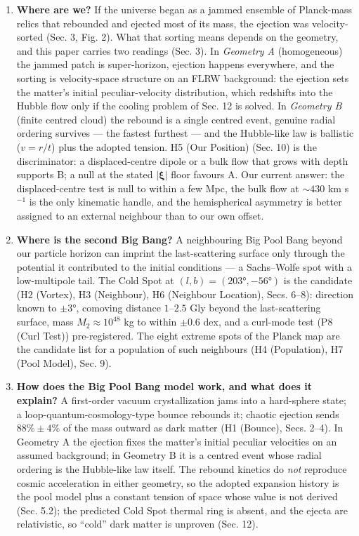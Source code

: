 \documentclass[
]{article}
\begin{document}
\begin{enumerate}
\def\labelenumi{\arabic{enumi}.}
\item
  \textbf{Where are we?} If the universe began as a jammed ensemble of
  Planck-mass relics that rebounded and ejected most of its mass, the
  ejection was velocity-sorted (Sec. 3, Fig. 2). What that sorting means
  depends on the geometry, and this paper carries two readings (Sec. 3).
  In \emph{Geometry A} (homogeneous) the jammed patch is super-horizon,
  ejection happens everywhere, and the sorting is velocity-space
  structure on an FLRW background: the ejection sets the matter's
  initial peculiar-velocity distribution, which redshifts into the
  Hubble flow only if the cooling problem of Sec. 12 is solved. In
  \emph{Geometry B} (finite centred cloud) the rebound is a single
  centred event, genuine radial ordering survives --- the fastest
  furthest --- and the Hubble-like law is ballistic (\(v = r/t\)) plus
  the adopted tension. H5 (Our Position) (Sec. 10) is the discriminator:
  a displaced-centre dipole or a bulk flow that grows with depth
  supports B; a null at the stated \(|\boldsymbol{\xi}|\) floor favours
  A. Our current answer: the displaced-centre test is null to within a
  few Mpc, the bulk flow at \(\sim\!430\) km s\(^{-1}\) is the only
  kinematic handle, and the hemispherical asymmetry is better assigned
  to an external neighbour than to our own offset.
\item
  \textbf{Where is the second Big Bang?} A neighbouring Big Pool Bang
  beyond our particle horizon can imprint the last-scattering surface
  only through the potential it contributed to the initial conditions
  --- a Sachs--Wolfe spot with a low-multipole tail. The Cold Spot at
  \((l,b) = (203°, -56°)\) is the candidate (H2 (Vortex), H3
  (Neighbour), H6 (Neighbour Location), Secs. 6--8): direction known to
  \(\pm 3°\), comoving distance \(1\)--\(2.5\) Gly beyond the
  last-scattering surface, mass \(M_2 \approx 10^{48}\) kg to within
  \(\pm 0.6\) dex, and a curl-mode test (P8 (Curl Test)) pre-registered.
  The eight extreme spots of the Planck map are the candidate list for a
  population of such neighbours (H4 (Population), H7 (Pool Model), Sec.
  9).
\item
  \textbf{How does the Big Pool Bang model work, and what does it
  explain?} A first-order vacuum crystallization jams into a hard-sphere
  state; a loop-quantum-cosmology-type bounce rebounds it; chaotic
  ejection sends \(88\% \pm 4\%\) of the mass outward as dark matter (H1
  (Bounce), Secs. 2--4). In Geometry A the ejection fixes the matter's
  initial peculiar velocities on an assumed background; in Geometry B it
  is a centred event whose radial ordering is the Hubble-like law
  itself. The rebound kinetics do \emph{not} reproduce cosmic
  acceleration in either geometry, so the adopted expansion history is
  the pool model plus a constant tension of space whose value is not
  derived (Sec. 5.2); the predicted Cold Spot thermal ring is absent,
  and the ejecta are relativistic, so ``cold'' dark matter is unproven
  (Sec. 12).
\end{enumerate}
\end{document}
